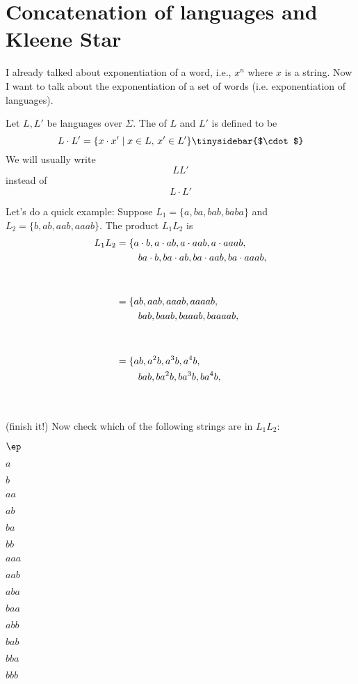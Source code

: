 \section{Concatenation of languages and Kleene Star}

I already talked about exponentiation of a word, 
i.e., $x^n$ where $x$ is a string.
Now I want to talk about the exponentiation of a set of words (i.e.
exponentiation of languages).

\begin{defn}
Let $L, L'$ be languages over $\Sigma$.
The
of $L$ and $L'$ is defined to be
\[
L \cdot L' = \{x \cdot x' \mid x \in L, \, x' \in L'\}
\index{$\cdot$}\tinysidebar{$\cdot$}
\]
We will usually write
\[
LL'
\]
instead of 
\[
L \cdot L'
\]
\end{defn}

Let's do a quick example:
Suppose $L_1 = \{a, ba, bab, baba\}$ 
and $L_2 = \{b, ab, aab, aaab\}$.
The product $L_1 L_2$ is
\begin{align*}
L_1L_2 
&=   \{a\cdot b, a\cdot ab, a \cdot aab, a \cdot aaab, \\
& \hspace{0.8cm} ba \cdot b, ba \cdot ab, ba \cdot aab, ba \cdot aaab, \\ 
& \\
& \\
&=   \{ab, aab, aaab, aaaab, \\
& \hspace{0.8cm} bab, baab, baaab, baaaab, \\ 
& \\
& \\
&=   \{ab, a^2b, a^3b, a^4b, \\
& \hspace{0.8cm} bab, ba^2b, ba^3b, ba^4b, \\ 
& \\
& \\
\end{align*}
(finish it!)
Now check which of the following strings are in $L_1L_2$:
\begin{tightlist}
\item $\ep$
\item $a$
\item $b$
\item $aa$
\item $ab$
\item $ba$
\item $bb$
\item $aaa$
\item $aab$
\item $aba$
\item $baa$
\item $abb$
\item $bab$
\item $bba$
\item $bbb$
\end{tightlist}



